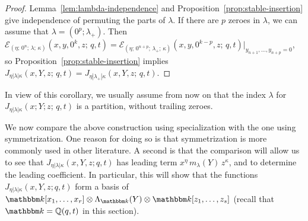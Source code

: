 \documentclass[12pt]{amsart}
\theoremstyle{definition}
\theoremstyle{remark}
\newcommand{\QQ}{{\mathbb Q}}
\newcommand{\kk}{{\mathbbm k}}
\newcommand{\Ecal}{{\mathcal E}}
\newcommand{\Jns}{J}           %
\begin{document}
\begin{proof}
Lemma~\ref{lem:lambda-independence} and
Proposition~\ref{prop:stable-insertion} give independence of permuting
the parts of $\lambda $.  If there are $p$ zeroes in $\lambda $, we
can assume that $\lambda = (0^{p};\lambda _{+})$.  Then $\Ecal _{(\eta
;\, 0^{n};\, \lambda ;\, \kappa )}(x,y,0^{k},z;\, q,t) = \Ecal _{(\eta
;\, 0^{n+p};\, \lambda _{+};\, \kappa )}(x,y,0^{k-p},z;\,
q,t)|_{y_{n+1},\ldots,y_{n+p} = 0}$, so
Proposition~\ref{prop:stable-insertion} implies $\Jns _{\eta |\lambda
|\kappa }(x,Y,z;\, q,t) = \Jns _{\eta |\lambda _{+} |\kappa
}(x,Y,z;\, q,t)$.
\end{proof}

In view of this corollary, we usually assume from now on that the
index $\lambda $ for $\Jns _{\eta |\lambda |\kappa }(x;Y;z;\, q,t)$ is
a partition, without trailing zeroes.

We now compare the above construction using specialization with the
one using symmetrization.  One reason for doing so is that
symmetrization is more commonly used in other literature.  A second is
that the comparison will allow us to see that $\Jns _{\eta |\lambda
|\kappa }(x,Y,z; q,t)$ has leading term $x^{\eta }\, m_{\lambda }(Y)\,
z^{\kappa }$, and to determine the leading coefficient.  In
particular, this will show that the functions $\Jns _{\eta |\lambda
|\kappa }(x,Y,z; q,t)$ form a basis of $\kk
[x_{1},\ldots,x_{r}]\otimes \Lambda _{\kk } (Y) \otimes \kk
[z_{1},\ldots, z_{s}]$ (recall that $\kk = \QQ(q,t)$ in this section).
\end{document}

